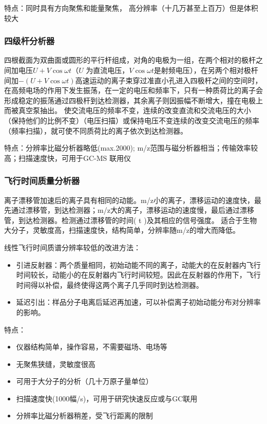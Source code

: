 特点：同时具有方向聚焦和能量聚焦， 高分辨率（十几万甚至上百万）但是体积较大
\subsubsection*{四级杆分析器}
四根截面为双曲面或圆形的平行杆组成，对角的电极为一组，在两个相对的极杆之间加电压$U+V\cos\omega t$（$U$ 为直流电压，$V\cos\omega t$是射频电压），在另两个相对极杆间加$-(U+V\cos\omega t)$高速运动的离子束穿过准直小孔进入四极杆之间的空间时，在高频电场的作用下发生振荡，在一定的电压和频率下，只有一种质荷比的离子会形成稳定的振荡通过四极杆到达检测器，其余离子则因振幅不断增大，撞在电极上而被真空泵抽出。 使交流电压的频率不变，连续的改变直流和交流电压的大小（保持他们的比例不变）（电压扫描）或保持电压不变连续的改变交流电压的频率（频率扫描），就可使不同质荷比的离子依次到达检测器。

特点：分辨率比磁分析器略低(max.2000); m/z范围与磁分析器相当；传输效率较高；扫描速度快，可用于GC-MS 联用仪

\subsubsection*{飞行时间质量分析器}
离子漂移管加速后的离子具有相同的动能。m/z小的离子，漂移运动的速度快，最先通过漂移管，到达检测器；m/z大的离子，漂移运动的速度慢，最后通过漂移管，到达检测器。检测通过漂移管的时间( t )及其相应的信号强度。
适合于生物大分子，灵敏度高，扫描速度快，结构简单，分辨率随m/z的增大而降低。

线性飞行时间质谱分辨率较低的改进方法： 
\begin{itemize}
    \item  引进反射器：两个质量相同，初始动能不同的离子，动能大的在反射器内飞行时间较长，动能小的在反射器内飞行时间较短。因此在反射器的作用下，飞行时间得以补偿，最终使得这两个离子几乎同时到达检测器。
    \item 延迟引出：样品分子电离后延迟再加速，可以补偿离子初始动能分布对分辨率的影响。
\end{itemize}

特点：
\begin{itemize}
    \item 仪器结构简单，操作容易，不需要磁场、电场等
    \item 无聚焦狭缝，灵敏度很高
    \item 可用于大分子的分析（几十万原子量单位）
    \item 扫描速度快(1000幅/s)，可用于研究快速反应或与GC联用
    \item 分辨率比磁分析器稍差，受飞行距离的限制
\end{itemize}


